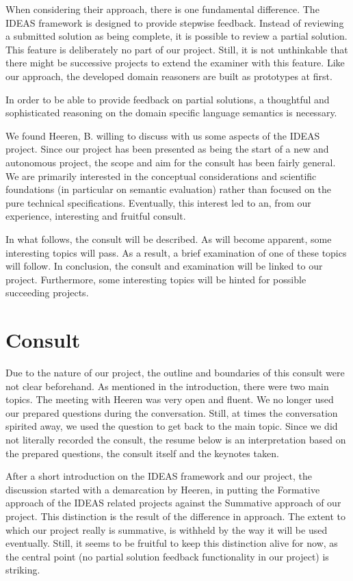 When considering their approach, there is one fundamental difference. The IDEAS
framework is designed to provide stepwise feedback. Instead of reviewing a
submitted solution as being complete, it is possible to review a partial solution. This
feature is deliberately no part of our project. Still, it is not unthinkable that there
might be successive projects to extend the \gls{examiner} with this feature.  
Like our approach, the developed domain reasoners are built as prototypes at first.


In order to be able to provide feedback on partial solutions, a thoughtful and 
sophisticated reasoning on the domain specific language semantics is necessary. 


We found Heeren, B. willing to discuss with us some aspects of the IDEAS project. Since
our project has been presented as being the 
start of a new and autonomous project, the scope and aim for
the consult has been fairly general. We are primarily interested in the 
conceptual considerations and scientific foundations (in particular on 
semantic evaluation) rather than focused on the pure technical specifications. 
Eventually, this interest led to an, from our experience, interesting and fruitful 
consult. 


In what follows, the consult will be described. As will become apparent, some interesting 
topics will pass. As a result, a brief examination of one of these topics will follow. 
In conclusion, the consult and examination will be linked to our project. Furthermore,
some interesting topics will be hinted for possible succeeding projects.


\section{Consult}
Due to the nature of our project, the outline and boundaries of this consult were not 
clear beforehand. As mentioned in the introduction, there were two main topics. 
The meeting with Heeren was very open and fluent. We no longer used our prepared 
questions during the conversation. Still, at times the conversation spirited away, 
we used the question to get back to the main topic. Since we did not literally
recorded the consult, the resume below is an interpretation based on the prepared 
questions, the consult itself and the keynotes taken.


After a short introduction on the IDEAS framework and our project, the discussion
started with a demarcation by Heeren, in putting the Formative approach of the 
IDEAS related projects against the Summative approach of our project. This 
distinction is the result of the difference in approach. The extent to which 
our project really is summative, is withheld by the way it will be used eventually. 
Still, it seems to be fruitful to keep this distinction alive for now, as the central 
point (no partial solution feedback functionality in our project) is striking.


